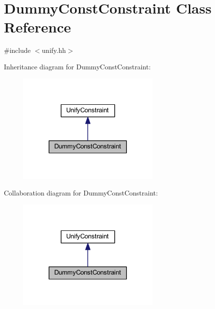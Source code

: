 \hypertarget{class_dummy_const_constraint}{}\section{Dummy\+Const\+Constraint Class Reference}
\label{class_dummy_const_constraint}


{\ttfamily \#include $<$unify.\+hh$>$}



Inheritance diagram for Dummy\+Const\+Constraint\+:
\nopagebreak
\begin{figure}[H]
\begin{center}
\leavevmode
\includegraphics[width=200pt]{class_dummy_const_constraint__inherit__graph}
\end{center}
\end{figure}


Collaboration diagram for Dummy\+Const\+Constraint\+:
\nopagebreak
\begin{figure}[H]
\begin{center}
\leavevmode
\includegraphics[width=200pt]{class_dummy_const_constraint__coll__graph}
\end{center}
\end{figure}
